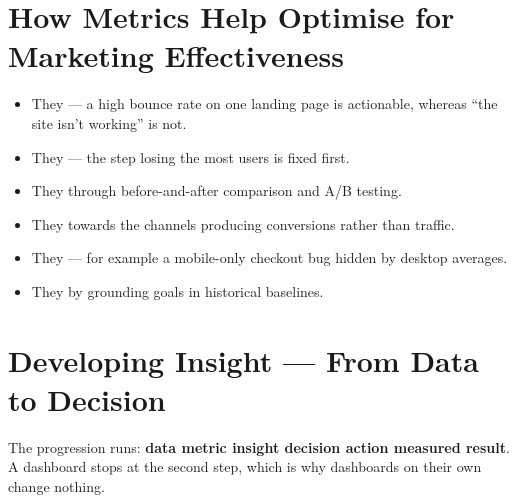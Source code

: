 \documentclass{MMTextbook}
\begin{document}
\section{How Metrics Help Optimise for Marketing Effectiveness}

\begin{exambox}
\begin{itemize}
\item They  --- a high bounce rate on one
      landing page is actionable, whereas ``the site isn't working'' is not.
\item They  --- the step losing the most users is
      fixed first.
\item They  through before-and-after comparison and
      A/B testing.
\item They  towards the channels producing conversions
      rather than traffic.
\item They  --- for example a mobile-only
      checkout bug hidden by desktop averages.
\item They  by grounding goals in historical
      baselines.
\end{itemize}
\end{exambox}

\section{Developing Insight --- From Data to Decision}

\begin{keybox}
The progression runs: \textbf{data \ra{} metric \ra{} insight \ra{} decision
\ra{} action \ra{} measured result}. A dashboard stops at the second step, which
is why dashboards on their own change nothing.
\end{keybox}
\end{document}
